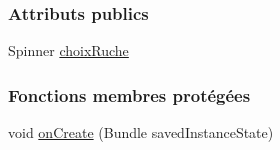 \subsubsection*{Attributs publics}
\begin{DoxyCompactItemize}
\item 
Spinner \hyperlink{classfr_1_1campus_1_1laurainc_1_1honeybee_1_1_dashboard_activity_ad3a78115526cf2cf371e6af8eb1b6b72}{choix\+Ruche}
\end{DoxyCompactItemize}
\subsubsection*{Fonctions membres protégées}
\begin{DoxyCompactItemize}
\item 
void \hyperlink{classfr_1_1campus_1_1laurainc_1_1honeybee_1_1_dashboard_activity_a8a6794a48e1b328dfc58d9d1c9237d79}{on\+Create} (Bundle saved\+Instance\+State)
\end{DoxyCompactItemize}
